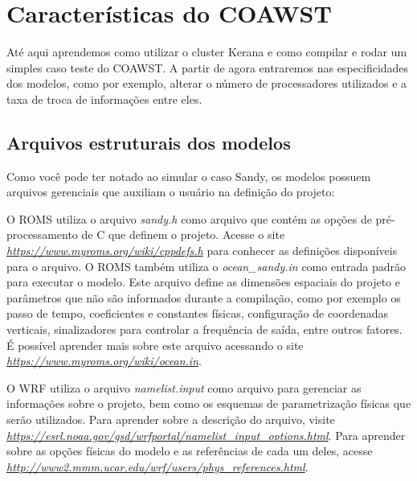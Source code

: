 \chapter{Características do COAWST}
\bigskip
\noindent Até aqui aprendemos como utilizar o cluster Kerana e como compilar e rodar um simples caso teste do COAWST. 
          A partir de agora entraremos nas especificidades dos modelos, como por exemplo, alterar o número de processadores utilizados
          e a taxa de troca de informações entre eles.
\bigskip

\section{Arquivos estruturais dos modelos}
\bigskip

\noindent Como você pode ter notado ao simular o caso Sandy, os modelos possuem arquivos gerenciais que auxiliam o usuário na definição 
          do projeto:
\bigskip

\noindent O ROMS utiliza o arquivo \textit{sandy.h} como arquivo que contém as opções de pré-processamento de C que definem o projeto.
          Acesse o site \textcolor{bleu_cite}{\href{https://www.myroms.org/wiki/cppdefs.h}{\textit{https://www.myroms.org/wiki/cppdefs.h}}} 
          para conhecer as definições disponíveis para o arquivo. O ROMS também utiliza o \textit{ocean\_sandy.in} como entrada padrão para 
          executar o modelo. Este arquivo define as dimensões espaciais do projeto e parâmetros que não são informados durante a compilação, 
          como por exemplo os passo de tempo, coeficientes e constantes físicas, configuração de coordenadas verticais, sinalizadores para 
          controlar a frequência de saída, entre outros fatores. É possível aprender mais sobre este arquivo acessando o 
          site \textcolor{bleu_cite}{\href{https://www.myroms.org/wiki/ocean.in}{\textit{https://www.myroms.org/wiki/ocean.in}}}.
\bigskip

\noindent O WRF utiliza o arquivo \textit{namelist.input} como arquivo para gerenciar as informações sobre o projeto, bem como os 
          esquemas de parametrização físicas que serão utilizados. Para aprender sobre a descrição do arquivo, 
          visite \textcolor{bleu_cite}{\href{https://esrl.noaa.gov/gsd/wrfportal/namelist\_input\_options.html}{\textit{https://esrl.noaa.gov/gsd/wrfportal/namelist\_input\_options.html}}}.
          Para aprender sobre as opções físicas do modelo e as referências de cada um deles, acesse 
          \textcolor{bleu_cite}{\href{http://www2.mmm.ucar.edu/wrf/users/phys\_references.html}{\textit{http://www2.mmm.ucar.edu/wrf/users/phys\_references.html}}}.
\bigskip

